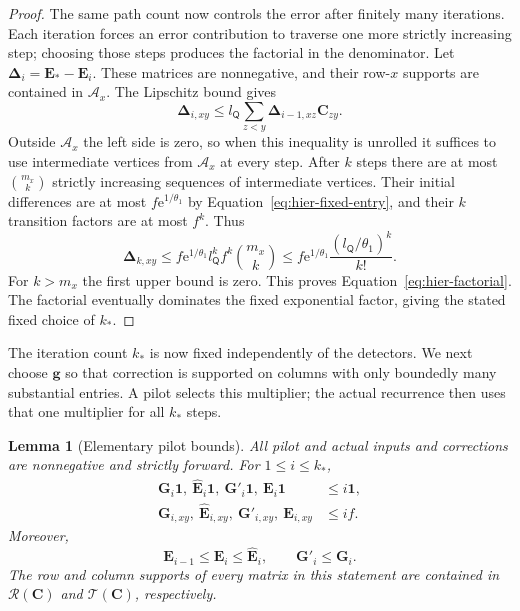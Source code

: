\documentclass[11pt]{article}
\numberwithin{equation}{section}
\newtheorem{lemma}[theorem]{Lemma}
\theoremstyle{definition}
\theoremstyle{remark}
\begin{document}
\begin{proof}
The same path count now controls the error after finitely many iterations. Each iteration forces an error contribution to traverse one more strictly increasing step; choosing those steps produces the factorial in the denominator. Let $\boldsymbol{\Delta}_i={\mathbf{E}}_*-{\mathbf{E}}_i$. These matrices are nonnegative, and their
row-$x$ supports are contained in ${\mathcal{A}}_x$.  The Lipschitz bound gives
\[
 \boldsymbol{\Delta}_{i,xy}\leq
 {l}_{\mathsf{Q}}\sum_{z<y}\boldsymbol{\Delta}_{i-1,xz}{\mathbf{C}}_{zy}.
\]
Outside ${\mathcal{A}}_x$ the left side is zero, so when this inequality is unrolled
it suffices to use intermediate vertices from ${\mathcal{A}}_x$ at every step.
After $k$ steps there are at most $\binom{m_x}{k}$ strictly increasing
sequences of intermediate vertices.  Their initial differences are at
most $f{\mathrm e}^{1/\theta_1}$ by Equation~\eqref{eq:hier-fixed-entry}, and
their $k$ transition factors are at most $f^k$.  Thus
\[
 \boldsymbol{\Delta}_{k,xy}
 \leq f{\mathrm e}^{1/\theta_1}{l}_{\mathsf{Q}}^kf^k\binom{m_x}{k}
 \leq f{\mathrm e}^{1/\theta_1}\frac{({l}_{\mathsf{Q}}/\theta_1)^k}{k!}.
\]
For $k>m_x$ the first upper bound is zero.  This proves
Equation~\eqref{eq:hier-factorial}.  The factorial eventually dominates
the fixed exponential factor, giving the stated fixed choice of $k_*$.
\end{proof}

The iteration count $k_*$ is now fixed independently of the detectors.
We next choose ${\mathbf{g}}$ so that correction is supported on columns with only
boundedly many substantial entries.  A pilot selects this multiplier;
the actual recurrence then uses that one multiplier for all $k_*$ steps.



\begin{lemma}[Elementary pilot bounds]
\label{lem:hier-pilot-bounds}
All pilot and actual inputs and corrections are nonnegative and strictly
forward.  For $1\leq i\leq k_*$,
\begin{align*}
 {\mathbf{G}}_i\mathbf 1,\ \widehat {\mathbf{E}}_i\mathbf 1,
     \ {\mathbf{G}}'_i\mathbf 1,\ {\mathbf{E}}_i\mathbf 1&\leq i\mathbf 1,\\
 {\mathbf{G}}_{i,xy},\ \widehat {\mathbf{E}}_{i,xy},
     \ {\mathbf{G}}'_{i,xy},\ {\mathbf{E}}_{i,xy}&\leq if.
\end{align*}
Moreover,
\[
 {\mathbf{E}}_{i-1}\leq {\mathbf{E}}_i\leq\widehat {\mathbf{E}}_i,
 \qquad {\mathbf{G}}'_i\leq {\mathbf{G}}_i.
\]
The row and column supports of every matrix in this statement are
contained in $\mathcal R({\mathbf{C}})$ and $\mathcal T({\mathbf{C}})$, respectively.
\end{lemma}
\end{document}
